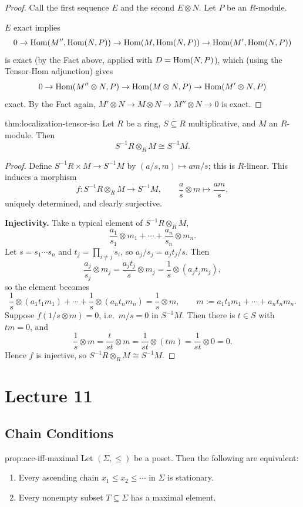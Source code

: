 \begin{proof}
Call the first sequence $E$ and the second $E\otimes N$. Let $P$ be an $R$-module.

$E$ exact implies
\[
0 \to \operatorname{Hom}(M'',\operatorname{Hom}(N,P)) \to \operatorname{Hom}(M,\operatorname{Hom}(N,P)) \to \operatorname{Hom}(M',\operatorname{Hom}(N,P))
\]
is exact (by the Fact above, applied with $D=\operatorname{Hom}(N,P)$), which (using the Tensor-Hom adjunction) gives
\[
0 \to \operatorname{Hom}(M''\otimes N,P) \to \operatorname{Hom}(M\otimes N,P) \to \operatorname{Hom}(M'\otimes N,P)
\]
exact. By the Fact again, $M'\otimes N \to M\otimes N \to M''\otimes N \to 0$ is exact.
\end{proof}

\begin{theorem}{}{thm:localization-tensor-iso}
Let $R$ be a ring, $S \subseteq R$ multiplicative, and $M$ an $R$-module. Then
\[
S^{-1}R \otimes_R M \cong S^{-1}M.
\]
\end{theorem}

\begin{proof}
Define $S^{-1}R \times M \to S^{-1}M$ by $(a/s, m) \mapsto am/s$; this is $R$-linear. This induces a morphism
\[
f: S^{-1}R \otimes_R M \to S^{-1}M, \qquad \frac as\otimes m \mapsto \frac{am}{s},
\]
uniquely determined, and clearly surjective.

\textbf{Injectivity.} Take a typical element of $S^{-1}R\otimes_R M$,
\[
\frac{a_1}{s_1}\otimes m_1 + \cdots + \frac{a_n}{s_n}\otimes m_n.
\]
Let $s = s_1\cdots s_n$ and $t_j = \prod_{i\neq j} s_i$, so $a_j/s_j = a_jt_j/s$. Then
\[
\frac{a_j}{s_j}\otimes m_j = \frac{a_jt_j}{s}\otimes m_j = \frac1s \otimes (a_jt_jm_j),
\]
so the element becomes
\[
\frac1s\otimes(a_1t_1m_1) + \cdots + \frac1s\otimes(a_nt_nm_n) = \frac1s \otimes m, \qquad m := a_1t_1m_1+\cdots+a_nt_nm_n.
\]
Suppose $f(1/s\otimes m) = 0$, i.e.\ $m/s = 0$ in $S^{-1}M$. Then there is $t\in S$ with $tm=0$, and
\[
\frac1s\otimes m = \frac{t}{st}\otimes m = \frac{1}{st}\otimes(tm) = \frac1{st}\otimes 0 = 0.
\]
Hence $f$ is injective, so $S^{-1}R\otimes_R M \cong S^{-1}M$.
\end{proof}

\section{Lecture 11}

\subsection*{Chain Conditions}

\begin{proposition}{}{prop:acc-iff-maximal}
Let $(\Sigma, \leq)$ be a poset. Then the following are equivalent:
\begin{enumerate}[label=(\arabic*)]
    \item Every ascending chain $x_1 \leq x_2 \leq \cdots$ in $\Sigma$ is stationary.
    \item Every nonempty subset $T \subseteq \Sigma$ has a maximal element.
\end{enumerate}
\end{proposition}

